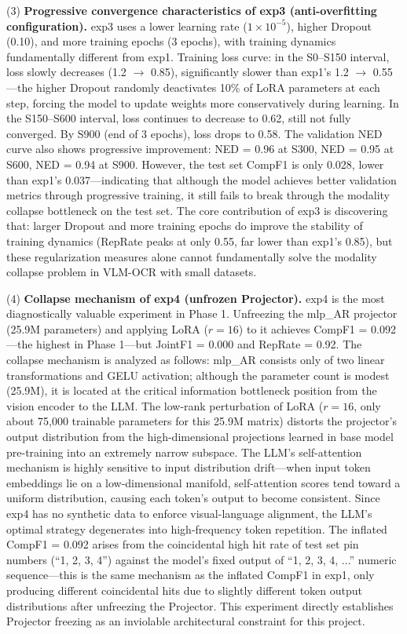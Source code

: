 (3) \textbf{Progressive convergence characteristics of exp3 (anti-overfitting configuration).} exp3 uses a lower learning rate ($1\times10^{-5}$), higher Dropout (0.10), and more training epochs (3 epochs), with training dynamics fundamentally different from exp1. Training loss curve: in the S0--S150 interval, loss slowly decreases (1.2 $\to$ 0.85), significantly slower than exp1's 1.2 $\to$ 0.55---the higher Dropout randomly deactivates 10\% of LoRA parameters at each step, forcing the model to update weights more conservatively during learning. In the S150--S600 interval, loss continues to decrease to 0.62, still not fully converged. By S900 (end of 3 epochs), loss drops to 0.58. The validation NED curve also shows progressive improvement: NED = 0.96 at S300, NED = 0.95 at S600, NED = 0.94 at S900. However, the test set CompF1 is only 0.028, lower than exp1's 0.037---indicating that although the model achieves better validation metrics through progressive training, it still fails to break through the modality collapse bottleneck on the test set. The core contribution of exp3 is discovering that: larger Dropout and more training epochs do improve the stability of training dynamics (RepRate peaks at only 0.55, far lower than exp1's 0.85), but these regularization measures alone cannot fundamentally solve the modality collapse problem in VLM-OCR with small datasets.

(4) \textbf{Collapse mechanism of exp4 (unfrozen Projector).} exp4 is the most diagnostically valuable experiment in Phase 1. Unfreezing the mlp\_AR projector (25.9M parameters) and applying LoRA ($r=16$) to it achieves CompF1 = 0.092---the highest in Phase 1---but JointF1 = 0.000 and RepRate = 0.92. The collapse mechanism is analyzed as follows: mlp\_AR consists only of two linear transformations and GELU activation; although the parameter count is modest (25.9M), it is located at the critical information bottleneck position from the vision encoder to the LLM. The low-rank perturbation of LoRA ($r=16$, only about 75,000 trainable parameters for this 25.9M matrix) distorts the projector's output distribution from the high-dimensional projections learned in base model pre-training into an extremely narrow subspace. The LLM's self-attention mechanism is highly sensitive to input distribution drift---when input token embeddings lie on a low-dimensional manifold, self-attention scores tend toward a uniform distribution, causing each token's output to become consistent. Since exp4 has no synthetic data to enforce visual-language alignment, the LLM's optimal strategy degenerates into high-frequency token repetition. The inflated CompF1 = 0.092 arises from the coincidental high hit rate of test set pin numbers (``1, 2, 3, 4'') against the model's fixed output of ``1, 2, 3, 4, ...'' numeric sequence---this is the same mechanism as the inflated CompF1 in exp1, only producing different coincidental hits due to slightly different token output distributions after unfreezing the Projector. This experiment directly establishes Projector freezing as an inviolable architectural constraint for this project.

